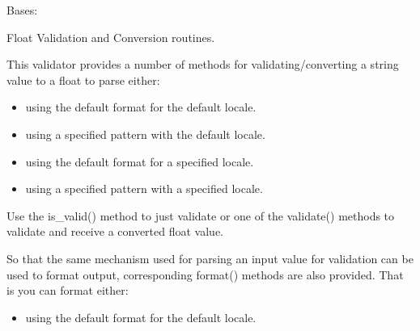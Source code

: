 \documentclass[letterpaper,10pt,english]{sphinxmanual}
\begin{document}
\begin{fulllineitems}
\label{\detokenize{apache_commons_validator_python.routines:apache_commons_validator_python.routines.float_validator.FloatValidator}}
\pysigstartsignatures
{}
\pysigstopsignatures
\sphinxAtStartPar
Bases: {\hyperref[\detokenize{apache_commons_validator_python.routines:apache_commons_validator_python.routines.abstract_number_validator.AbstractNumberValidator}]{}}

\sphinxAtStartPar
Float Validation and Conversion routines.

\sphinxAtStartPar
This validator provides a number of methods for validating/converting a string value
to a float to parse either:
\begin{itemize}
\item {} 
\sphinxAtStartPar
using the default format for the default locale.

\item {} 
\sphinxAtStartPar
using a specified pattern with the default locale.

\item {} 
\sphinxAtStartPar
using the default format for a specified locale.

\item {} 
\sphinxAtStartPar
using a specified pattern with a specified locale.

\end{itemize}

\sphinxAtStartPar
Use the is\_valid() method to just validate or one of the validate() methods to
validate and receive a converted float value.

\sphinxAtStartPar
So that the same mechanism used for parsing an input value for validation can be used to format output,
corresponding format() methods are also provided. That is you can format either:
\begin{itemize}
\item {} 
\sphinxAtStartPar
using the default format for the default locale.


\end{itemize}
\end{fulllineitems}
\end{document}
